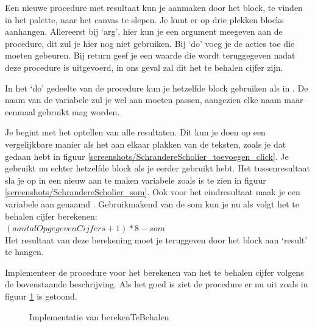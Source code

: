 Een nieuwe procedure met resultaat kun je aanmaken door het  block, te vinden in het  palette, naar het canvas te slepen. Je kunt er op drie plekken blocks aanhangen. Allereerst bij `arg', hier kun je een argument meegeven aan de procedure, dit zul je hier nog niet gebruiken. Bij `do' voeg je de acties toe die moeten gebeuren. Bij return geef je een waarde die wordt teruggegeven nadat deze procedure is uitgevoerd, in ons geval zal dit het te behalen cijfer zijn.

In het `do' gedeelte van de procedure kun je hetzelfde  block gebruiken als in . De naam van de variabele zul je wel aan moeten passen, aangezien elke naam maar eenmaal gebruikt mag worden. 

Je begint met het optellen van alle resultaten. Dit kun je doen op een vergelijkbare manier als het aan elkaar plakken van de teksten, zoals je dat gedaan hebt in figuur \ref{screenshots/SchrandereScholier_toevoegen_click}. Je gebruikt nu echter hetzelfde \block{+} block als je eerder gebruikt hebt. Het tussenresultaat sla je op in een nieuw aan te maken variabele zoals is te zien in figuur \ref{screenshots/SchrandereScholier_som}. Ook voor het eindresultaat maak je een variabele aan genaamd . Gebruikmakend van de som kun je nu als volgt het te behalen cijfer berekenen: \\$(aantalOpgegevenCijfers+1) * 8 - som$ \\Het resultaat van deze berekening moet je teruggeven door het block  aan `result' te hangen.

 \begin{opgave}
    \opgVraag
Implementeer de procedure voor het berekenen van het te behalen cijfer volgens de bovenstaande beschrijving.
    \opgUitwerking
    Als het goed is ziet de procedure er nu uit zoals in figuur \ref{screenshots/SchrandereScholier_berekenTeBehalen} is getoond.
\end{opgave}

\begin{figure}
    \caption{\label{screenshots/SchrandereScholier_berekenTeBehalen} Implementatie van berekenTeBehalen}
\end{figure}


